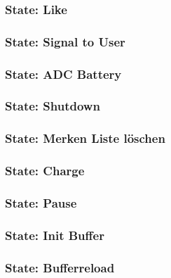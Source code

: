 \subsubsection*{State: Like}

\subsubsection*{State: Signal to User}

\subsubsection*{State: ADC Battery}

\subsubsection*{State: Shutdown}

\subsubsection*{State: Merken Liste löschen}

\subsubsection*{State: Charge}

\subsubsection*{State: Pause}

\subsubsection*{State: Init Buffer}

\subsubsection*{State: Bufferreload}